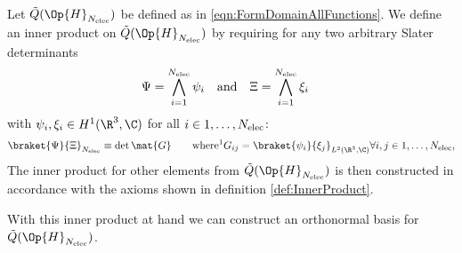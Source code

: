 \begin{defn}
	Let $\tilde{Q}(\Op{H}_{\Nelec})$ be defined as in \eqref{eqn:FormDomainAllFunctions}.
	We define an inner product on $\tilde{Q}(\Op{H}_{\Nelec})$ by
	requiring for any two arbitrary Slater determinants
	\begin{align*}
		\Psi &= \bigwedge_{i=1}^{N_\text{elec}} \psi_i
		&&\text{and}& \Xi &= \bigwedge_{i=1}^{N_\text{elec}} \xi_i
	\end{align*}
	with $\psi_i, \xi_i \in H^1(\R^3, \C)$ for all $i \in 1,\ldots,N_\text{elec}$:
	\begin{align}
		\braket{\Psi}{\Xi}_{\Nelec} \equiv \det \mat{G}
		\qquad
		\text{where\footnotemark } G_{ij} = \braket{\psi_i}{\xi_j}_{L^2(\R^3, \C)} \forall i,j \in 1,\ldots,\Nelec,
		\label{eqn:InnerProductFormDomain}
	\end{align}
	The inner product for other elements from $\tilde{Q}(\Op{H}_{\Nelec})$
	is then constructed in accordance
	with the axioms shown in definition \vref{def:InnerProduct}.
\end{defn}

\noindent
With this inner product at hand we can construct an orthonormal basis for
$\tilde{Q}(\Op{H}_{\Nelec})$.

